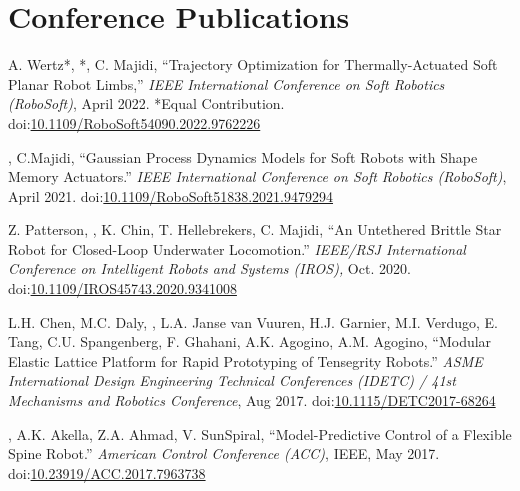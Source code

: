 \documentclass[letterpaper]{deedy-resume} %
\newcommand\doilink[1]{\href{http://dx.doi.org/#1}{#1}}
\newcommand\doi[1]{doi:\doilink{#1}}
\begin{document}
{\begin{etaremune}[itemsep=0.1cm]
\end{etaremune}


\section{Conference Publications}
\vspace{0.2cm}

\begin{etaremune}[itemsep=0.1cm]

\item A. Wertz*, \underline{{}}*, C. Majidi, ``Trajectory Optimization for Thermally-Actuated Soft Planar Robot Limbs,'' {\it IEEE International Conference on Soft Robotics (RoboSoft)}, April 2022. *Equal Contribution. \doi{10.1109/RoboSoft54090.2022.9762226}

\item \underline{{}}, C.Majidi, ``Gaussian Process Dynamics Models for Soft Robots with Shape Memory Actuators.'' {\it IEEE International Conference on Soft Robotics (RoboSoft)}, April 2021.  \doi{10.1109/RoboSoft51838.2021.9479294}

\item Z. Patterson, \underline{{}}, K. Chin, T. Hellebrekers, C. Majidi, ``An Untethered Brittle Star Robot for Closed-Loop Underwater Locomotion.'' {\it IEEE/RSJ International Conference on Intelligent Robots and Systems (IROS),} Oct. 2020. \doi{10.1109/IROS45743.2020.9341008}

\item L.H. Chen, M.C. Daly, \underline{{}}, L.A. Janse van Vuuren, H.J. Garnier, M.I. Verdugo, E. Tang, C.U. Spangenberg, F. Ghahani, A.K. Agogino, A.M. Agogino, ``Modular Elastic Lattice Platform for Rapid Prototyping of Tensegrity Robots.'' {\it  ASME International Design Engineering Technical Conferences (IDETC) / 41st Mechanisms and Robotics Conference}, Aug 2017. \doi{10.1115/DETC2017-68264}

\item \underline{{}}, A.K. Akella, Z.A. Ahmad, V. SunSpiral, ``Model-Predictive Control of a Flexible Spine Robot.'' {\it American Control Conference (ACC)}, IEEE, May 2017. \doi{10.23919/ACC.2017.7963738}


\end{etaremune}}
\end{document}
